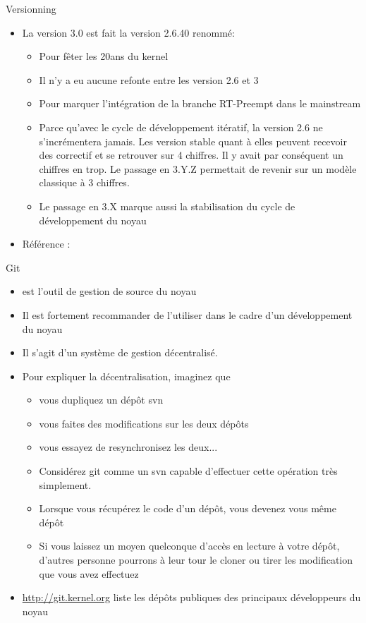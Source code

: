 \begin{frame}[fragile=singleslide]{Versionning}
  \begin{itemize}
  \item La version 3.0 est fait la version 2.6.40 renommé:
    \begin{itemize}
    \item Pour fêter les 20ans du kernel
    \item Il n'y a eu aucune refonte entre les version 2.6 et 3
    \item Pour marquer l'intégration  de la branche RT-Preempt dans le
      mainstream
    \item  Parce  qu'avec  le  cycle de  développement  itératif,  la
      version 2.6 ne s'incrémentera jamais. Les version stable quant à
      elles  peuvent recevoir  des  correctif et  se  retrouver sur  4
      chiffres.  Il y  avait par  conséquent un  chiffres en  trop. Le
      passage en 3.Y.Z permettait de revenir sur un modèle classique à
      3 chiffres.
    \item Le passage en 3.X  marque aussi la stabilisation du cycle de
      développement du noyau
    \end{itemize} 
  \item Référence : 
  \end{itemize} 
\end{frame} 

\begin{frame}[fragile=singleslide]{Git}
  \begin{itemize} 
  \item {} est l'outil de gestion de source du noyau
  \item  Il est fortement  recommander de  l'utiliser dans  le cadre
    d'un développement du noyau
  \item Il s'agit d'un système de gestion décentralisé. 
  \item Pour expliquer la décentralisation, imaginez que
    \begin{itemize} 
    \item vous dupliquez un dépôt svn
    \item vous faites des modifications sur les deux dépôts
    \item vous essayez de resynchronisez les deux...
    \item  Considérez  git  comme  un svn  capable  d'effectuer  cette
      opération très simplement.
    \item Lorsque vous récupérez le code d'un dépôt, vous devenez vous
      même dépôt
    \item Si  vous laissez  un moyen quelconque  d'accès en  lecture à
      votre dépôt, d'autres personne pourrons à leur tour le cloner ou
      tirer les modification que vous avez effectuez
    \end{itemize} 
  \item  \url{http://git.kernel.org} liste  les  dépôts publiques  des
    principaux développeurs du noyau
  \end{itemize}
\end{frame}

